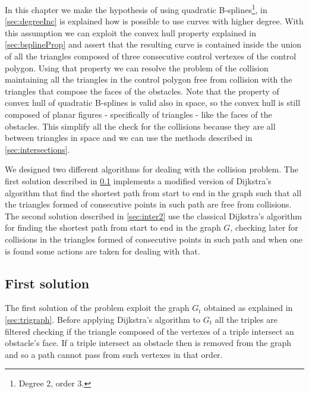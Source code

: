 \documentclass[dissertation.tex]{subfiles}
\begin{document}
In this chapter we make the hypothesis of using
quadratic B-splines\footnote{Degree 2, order 3.}, in
\cref{sec:degreeInc} is explained how is possible to use curves with
higher degree. With this assumption we can exploit the convex hull
property explained in \cref{sec:bsplineProp} and assert that the
resulting curve is contained inside the union of all the triangles
composed of three consecutive control vertexes of the control
polygon. Using that property we can resolve the problem of the
collision maintaining all the triangles in the control polygon free
from collision with the triangles that compose the faces of the
obstacles. Note that the property of convex hull of quadratic
B-splines is valid also in space, so the convex hull is still composed
of planar figures - specifically of triangles - like the faces of the
obstacles. This simplify all the check for the collisions because they
are all between triangles in space and we can use the methods
described in \cref{sec:intersections}.

We designed two different algorithms for dealing with the collision
problem. The first solution described in \cref{sec:inter1} implements
a modified version of Dijkstra's
algorithm that find the shortest path from start to end in the graph
such that all the triangles formed of consecutive points in such path
are free from collisions. The second solution described in
\cref{sec:inter2} use the classical Dijkstra's algorithm for finding
the shortest path from start to end in the graph $G$, checking later for
collisions in the triangles formed of consecutive points in such path
and when one is found some actions are taken for dealing with that.

\subsection{First solution}\label{sec:inter1}
The first solution of the problem exploit the graph $G_t$ obtained as
explained in \cref{sec:trigraph}. Before applying Dijkstra's algorithm
to $G_t$ all the triples are filtered checking if the
triangle composed of the vertexes of a triple intersect an obstacle's
face. If a triple intersect an obstacle then is removed from the graph
and so a path cannot pass from such vertexes in that order.
\end{document}
